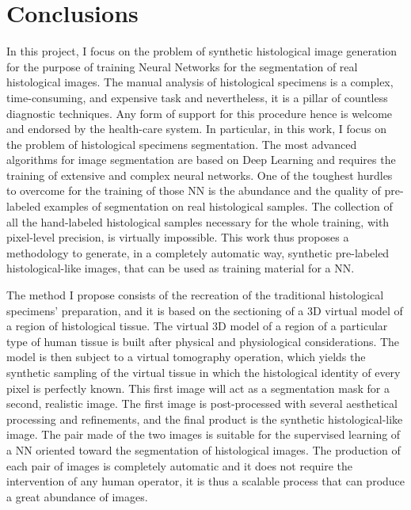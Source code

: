 \chapter*{Conclusions}
\label{chap:concl}

In this project, I focus on the problem of synthetic histological image generation for the purpose of training Neural Networks for the segmentation of real histological images. The manual analysis of histological specimens is a complex, time-consuming, and expensive task and nevertheless, it is a pillar of countless diagnostic techniques. Any form of support for this procedure hence is welcome and endorsed by the health-care system. In particular, in this work, I focus on the problem of histological specimens segmentation. The most advanced algorithms for image segmentation are based on Deep Learning and requires the training of extensive and complex neural networks. One of the toughest hurdles to overcome for the training of those NN is the abundance and the quality of pre-labeled examples of segmentation on real histological samples. The collection of all the hand-labeled histological samples necessary for the whole training, with pixel-level precision, is virtually impossible. This work thus proposes a methodology to generate, in a completely automatic way, synthetic pre-labeled histological-like images, that can be used as training material for a NN.

The method I propose consists of the recreation of the traditional histological specimens' preparation, and it is based on the sectioning of a 3D virtual model of a region of histological tissue. The virtual 3D model of a region of a particular type of human tissue is built after physical and physiological considerations. The model is then subject to a virtual tomography operation, which yields the synthetic sampling of the virtual tissue in which the histological identity of every pixel is perfectly known. This first image will act as a segmentation mask for a second, realistic image. The first image is post-processed with several aesthetical processing and refinements, and the final product is the synthetic histological-like image. The pair made of the two images is suitable for the supervised learning of a NN oriented toward the segmentation of histological images. The production of each pair of images is completely automatic and it does not require the intervention of any human operator, it is thus a scalable process that can produce a great abundance of images.

